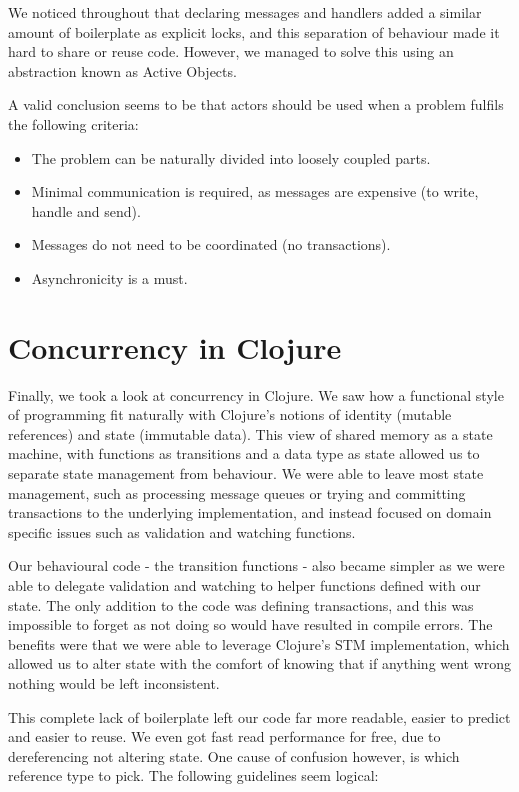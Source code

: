 \documentclass[a4paper,12pt]{kth-mag}
\begin{document}
We noticed throughout that declaring messages and handlers added a similar amount of boilerplate as explicit locks, and this separation of behaviour made it hard to share or reuse code. However, we managed to solve this using an abstraction known as Active Objects.

A valid conclusion seems to be that actors should be used when a problem fulfils the following criteria:

\begin{itemize}
\item The problem can be naturally divided into loosely coupled parts.
\item Minimal communication is required, as messages are expensive (to write, handle and send).
\item Messages do not need to be coordinated (no transactions).
\item Asynchronicity is a must.
\end{itemize}

\section{Concurrency in Clojure}

Finally, we took a look at concurrency in Clojure. We saw how a functional style of programming fit naturally with Clojure's notions of identity (mutable references) and state (immutable data). This view of shared memory as a state machine, with functions as transitions and a data type as state allowed us to separate state management from behaviour. We were able to leave most state management, such as processing message queues or trying and committing transactions to the underlying implementation, and instead focused on domain specific issues such as validation and watching functions.

Our behavioural code - the transition functions - also became simpler as we were able to delegate validation and watching to helper functions defined with our state. The only addition to the code was defining transactions, and this was impossible to forget as not doing so would have resulted in compile errors. The benefits were that we were able to leverage Clojure's STM implementation, which allowed us to alter state with the comfort of knowing that if anything went wrong nothing would be left inconsistent. 

This complete lack of boilerplate left our code far more readable, easier to predict and easier to reuse. We even got fast read performance for free, due to dereferencing not altering state. One cause of confusion however, is which reference type to pick. The following guidelines seem logical:
\end{document}

